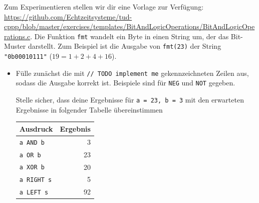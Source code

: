 Zum Experimentieren stellen wir dir eine Vorlage zur Verfügung: \url{https://github.com/Echtzeitsysteme/tud-cppp/blob/master/exercises/templates/BitAndLogicOperations/BitAndLogicOperations.c}.
Die Funktion \lstinline|fmt| wandelt ein Byte in einen String um, der das Bit-Muster darstellt.
Zum Beispiel ist die Ausgabe von \lstinline|fmt(23)| der String \lstinline|"0b00010111"| ($19 = 1 + 2 + 4 + 16$).
\begin{itemize}
\item 
Fülle zunächst die mit \lstinline|// TODO implement me| gekennzeichneten Zeilen aus, sodass die Ausgabe korrekt ist.
Beispiele sind für \texttt{NEG} und \texttt{NOT} gegeben.

Stelle sicher, dass deine Ergebnisse für \lstinline|a = 23, b = 3| mit den erwarteten Ergebnisse in folgender Tabelle übereinstimmen\\[1ex]
\begin{center}
\begin{tabular}{lr}
\toprule
\textbf{Ausdruck} & \textbf{Ergebnis}\\
\midrule
\texttt{a AND b} & 3\\
\texttt{a OR b} & 23\\
\texttt{a XOR b} & 20\\
\midrule
\texttt{a RIGHT s} & 5\\
\texttt{a LEFT s} & 92\\
\bottomrule
\end{tabular}
\end{center}


\end{itemize}
